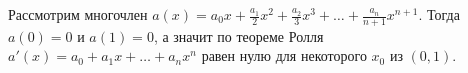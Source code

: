 \documentclass{article}
\begin{document}
Рассмотрим многочлен $a(x)=a_0x+\frac{a_1}{2}x^2+\frac{a_2}{3}x^3+\ldots+\frac{a_n}{n+1}x^{n+1}$. Тогда $a(0)=0$ и $a(1)=0$, а значит по теореме Ролля $a'(x)=a_0+a_1x+\ldots+a_nx^n$ равен нулю для некоторого $x_0$ из $(0,1)$.
\end{document}
